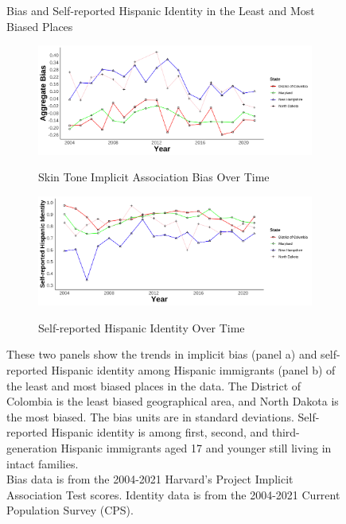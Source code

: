 \documentclass[12pt,english]{article}
\begin{document}
\begin{center}
\begin{figure}[H]
\caption{Bias and Self-reported Hispanic Identity in the Least and Most Biased Places}

\begin{subfigure}{.9\textwidth}
\caption{Skin Tone Implicit Association Bias Over Time}
\centering
\includegraphics[width=.9\linewidth]{figure/Bias_twostates.png} 
\label{fig:skiniat}
\end{subfigure}
\begin{subfigure}{.9\textwidth}
\caption{Self-reported Hispanic Identity Over Time}
\centering
\includegraphics[width=.9\linewidth]{figure/Bias_twostates-hisp.png} 
\label{fig:hispanic-twostates}
\end{subfigure}
\caption*{\footnotesize{These two panels show the trends in implicit bias (panel a) and self-reported Hispanic identity among Hispanic immigrants (panel b) of the least and most biased places in the data. The District of Colombia is the least biased geographical area, and North Dakota is the most biased. The bias units are in standard deviations. Self-reported Hispanic identity is among first, second, and third-generation Hispanic immigrants aged 17 and younger still living in intact families.\\
Bias data is from the 2004-2021 Harvard's Project Implicit Association Test scores. Identity data is from the 2004-2021 Current Population Survey (CPS).}}
\end{figure}
\end{center}
\end{document}
